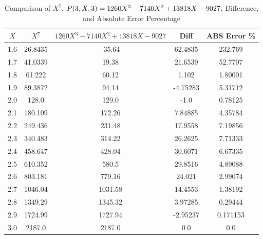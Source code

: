 ﻿\begin{table}[h!]
    \centering
    \caption{Comparison of $X^7$, ${P}(3,X,3) = 1260X^3 - 7140X^2 + 13818X - 9027$, Difference, and Absolute Error Percentage}
    \begin{tabular}{|c|c|c|c|c|}
        \hline
        $X$ & $X^7$   & $1260X^3 - 7140X^2 + 13818X - 9027$ & \textbf{Diff} & \textbf{ABS Error \%} \\ \hline
        1.6 & 26.8435 & -35.64                              & 62.4835       & 232.769               \\ \hline
        1.7 & 41.0339 & 19.38                               & 21.6539       & 52.7707               \\ \hline
        1.8 & 61.222  & 60.12                               & 1.102         & 1.80001               \\ \hline
        1.9 & 89.3872 & 94.14                               & -4.75283      & 5.31712               \\ \hline
        2.0 & 128.0   & 129.0                               & -1.0          & 0.78125               \\ \hline
        2.1 & 180.109 & 172.26                              & 7.84885       & 4.35784               \\ \hline
        2.2 & 249.436 & 231.48                              & 17.9558       & 7.19856               \\ \hline
        2.3 & 340.483 & 314.22                              & 26.2625       & 7.71333               \\ \hline
        2.4 & 458.647 & 428.04                              & 30.6071       & 6.67335               \\ \hline
        2.5 & 610.352 & 580.5                               & 29.8516       & 4.89088               \\ \hline
        2.6 & 803.181 & 779.16                              & 24.021        & 2.99074               \\ \hline
        2.7 & 1046.04 & 1031.58                             & 14.4553       & 1.38192               \\ \hline
        2.8 & 1349.29 & 1345.32                             & 3.97285       & 0.29444               \\ \hline
        2.9 & 1724.99 & 1727.94                             & -2.95237      & 0.171153              \\ \hline
        3.0 & 2187.0  & 2187.0                              & 0.0           & 0.0                   \\ \hline

\end{tabular}
\end{table}
